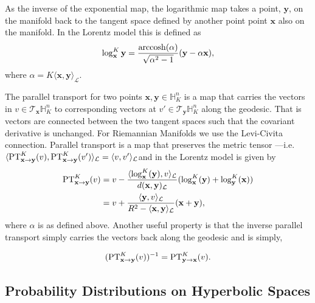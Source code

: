 As the inverse of the exponential map, the logarithmic map takes a point, $\textbf{y}$, on the manifold back to the tangent space defined by another point point $\textbf{x}$ also on the manifold. In the Lorentz model this is defined as
\begin{equation*}
    \log^K_{\textbf{x}}{\textbf{y}} = \frac{\operatorname{arccosh}(\alpha)}{\sqrt{\alpha^2 - 1}}(\textbf{y} - \alpha \textbf{x}),
\end{equation*}
where $\alpha = K\langle \textbf{x}, \textbf{y} \rangle_{\mathcal{L}}$.

The parallel transport for two points $\textbf{x},\textbf{y} \in \mathbb{H}^{n}_K$ is a map that carries the vectors in $v \in \mathcal{T}_{\textbf{x}}\mathbb{H}^{n}_K$ to corresponding vectors at $v' \in \mathcal{T}_{\textbf{y}}\mathbb{H}^{n}_K$ along the geodesic. That is vectors are connected between the two tangent spaces such that the covariant derivative is unchanged. For Riemannian Manifolds we use the Levi-Civita connection. Parallel transport is a map that preserves the metric tensor ---i.e. $\langle \textnormal{PT}^K_{\textbf{x} \to \textbf{y}}(v), \textnormal{PT}^K_{\textbf{x} \to \textbf{y}}(v') \rangle_{\mathcal{L}} = \langle v, v' \rangle_{\mathcal{L}}$and in the Lorentz model is given by
\begin{align*}
    \textnormal{PT}^K_{\textbf{x} \to \textbf{y}}(v) & = v - \frac{ \langle \log^K_{\textbf{x}}(\textbf{y}), v \rangle_{\mathcal{L}}}{d(\textbf{x},\textbf{y})_{\mathcal{L}}} (\log^K_{\textbf{x}}(\textbf{y})+ \log^K_{\textbf{y}}(\textbf{x})) \\
    & = v + \frac{ \langle \textbf{y}, v \rangle_{\mathcal{L}}}{R^2 - \langle \textbf{x}, \textbf{y} \rangle_{\mathcal{L}}} (\textbf{x}+ \textbf{y}),
\end{align*}
where $\alpha$ is as defined above. Another useful property is that the inverse parallel transport simply carries the vectors back along the geodesic and is simply,

\begin{equation}
      (\textnormal{PT}^{K}_{\textbf{x} \to \textbf{y}}(v))^{-1} = \textnormal{PT}^K_{\textbf{y} \to \textbf{x}}(v).
\end{equation}

\subsection{Probability Distributions on Hyperbolic Spaces}


